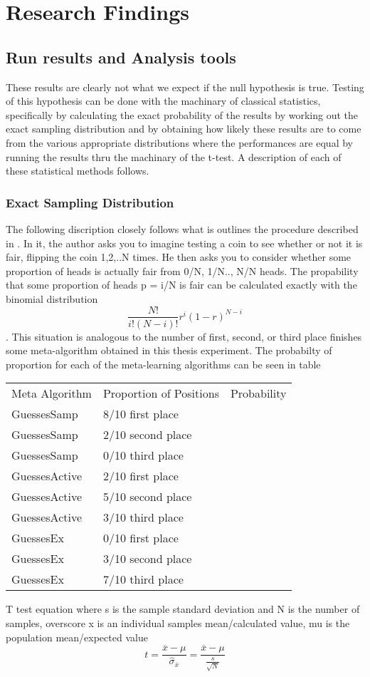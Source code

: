 \chapter{Research Findings}
\label{Chapter4}
\section{Run results and Analysis tools}
These results are clearly not what we expect if the null hypothesis is true. Testing of this hypothesis can be done with the machinary of classical statistics, specifically by calculating
the exact probability of the results by working out the exact sampling distribution and by obtaining how likely these results are to come from the various appropriate distributions where
the performances are equal by running the results thru the machinary of the t-test. A description of each of these statistical methods follows.
\subsection{Exact Sampling Distribution}
The following discription closely follows what is outlines the procedure described in \cite{Cohen}. In it, the author asks you to imagine testing a coin to see whether or not it
is fair, flipping the coin 1,2,..N times. He then asks you to consider whether some proportion of heads is actually fair from 0/N, 1/N.., N/N heads. The propability that some proportion of heads
p = i/N is fair can be calculated exactly with the binomial distribution $$\frac{N!}{i!(N-i)!}r^{i}(1-r)^{N-i}$$. This situation is analogous to the number of first, second, or third place finishes
some meta-algorithm obtained in this thesis experiment. The probabilty of proportion for each of the meta-learning algorithms can be seen in table

\begin{table}[]
\begin{tabular}{lll}
Meta Algorithm & Proportion of Positions & Probability \\
GuessesSamp    & 8/10 first place        &             \\
GuessesSamp    & 2/10 second place       &             \\
GuessesSamp    & 0/10 third place        &             \\
GuessesActive  & 2/10 first place        &             \\
GuessesActive  & 5/10 second place       &             \\
GuessesActive  & 3/10 third place        &             \\
GuessesEx      & 0/10 first place        &             \\
GuessesEx      & 3/10 second place       &             \\
GuessesEx      & 7/10 third place        &
\end{tabular}
\end{table}

T test equation where s is the sample standard deviation and N is the number of samples, overscore x is an individual samples mean/calculated value, mu is the
population mean/expected value
$$t =\frac{\overline{x}-\mu}{\hat{\sigma}_{\overline{x}}} = \frac{\overline{x}-\mu}{\frac{s}{\sqrt{N}}}$$

